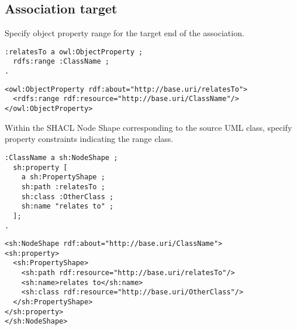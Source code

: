 \subsection{Association target}

\begin{trule}
	\label{rule:association-uni-range-rc}
	Specify object property range for the target end of the association. 
\end{trule}
\vspace{-\parskip}
\begin{minipage}[b]{.385\textwidth}
\begin{lstlisting}[language=Turtle, caption={Range specification in Turtle syntax}, captionpos=b]
:relatesTo a owl:ObjectProperty ;
  rdfs:range :ClassName ;
.
\end{lstlisting}
\end{minipage}%
\quad\vspace{-\parskip}
\begin{minipage}[b]{.6\textwidth}
\begin{lstlisting}[language=RDF/XML, caption={Range specification in  RDF/XML syntax}, captionpos=b]
<owl:ObjectProperty rdf:about="http://base.uri/relatesTo">
  <rdfs:range rdf:resource="http://base.uri/ClassName"/>
</owl:ObjectProperty>
\end{lstlisting}
\end{minipage}
\vspace{-\parskip}

\begin{trule}
	\label{rule:association-uni-range-dc}
	Within the SHACL Node Shape corresponding to the source UML class, specify property constraints indicating the range class.
\end{trule}

\vspace{-\parskip}
\begin{minipage}[b]{.385\textwidth}
\begin{lstlisting}[language=Turtle, caption={Property class constraint in Turtle syntax}, captionpos=b]
:ClassName a sh:NodeShape ;
  sh:property [
    a sh:PropertyShape ;
    sh:path :relatesTo ;
    sh:class :OtherClass ;
    sh:name "relates to" ;
  ];
.    
\end{lstlisting}
\end{minipage}%
\quad\vspace{-\parskip}
\begin{minipage}[b]{.6\textwidth}
\begin{lstlisting}[language=RDF/XML, caption={Property class constraint in RDF/XML syntax}, captionpos=b]
<sh:NodeShape rdf:about="http://base.uri/ClassName">
<sh:property>
  <sh:PropertyShape>
    <sh:path rdf:resource="http://base.uri/relatesTo"/>
    <sh:name>relates to</sh:name>
    <sh:class rdf:resource="http://base.uri/OtherClass"/>
  </sh:PropertyShape>
</sh:property>
</sh:NodeShape>
\end{lstlisting}
\end{minipage}
\vspace{-\parskip}

